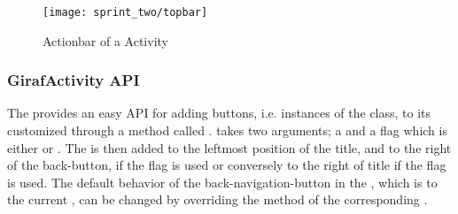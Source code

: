 \begin{figure}[!htbp]
    \centering
    \texttt{[image: sprint\_two/topbar]}
    \caption{Actionbar of a \giraf Activity}
    \label{fig:topbar}
\end{figure}

\subsubsection{GirafActivity API}

The  provides an easy API for adding \giraf buttons, i.e. instances of the  class, to its customized  through a method called .  takes two arguments; a  and a flag which is either  or . The  is then added to the leftmost position of the title, and to the right of the back-button, if the  flag is used or conversely to the right of title if the  flag is used. 
The default behavior of the back-navigation-button in the , which is to  the current , can be changed by overriding the  method of the corresponding .          
